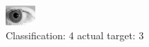 \begin{figure}[h!]
\begin{center}
\includegraphics[width=0.60\columnwidth]{figures/ID210_class_4_target_3.png}
\end{center}
\caption{ Classification: 4 actual target: 3}
\label{fig:ID210_class_4_target_3}
\end{figure}
